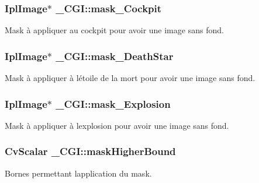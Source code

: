 \subsubsection[{\texorpdfstring{mask\+\_\+\+Cockpit}{mask_Cockpit}}]{\setlength{\rightskip}{0pt plus 5cm}Ipl\+Image$\ast$ \+\_\+\+C\+G\+I\+::mask\+\_\+\+Cockpit}\hypertarget{struct___c_g_i_abdbc066c115db2c77957e1b1cd51a996}{}\label{struct___c_g_i_abdbc066c115db2c77957e1b1cd51a996}
Mask à appliquer au cockpit pour avoir une image sans fond. 
\subsubsection[{\texorpdfstring{mask\+\_\+\+Death\+Star}{mask_DeathStar}}]{\setlength{\rightskip}{0pt plus 5cm}Ipl\+Image$\ast$ \+\_\+\+C\+G\+I\+::mask\+\_\+\+Death\+Star}\hypertarget{struct___c_g_i_a011dd009bdd05e19be0de580375359f3}{}\label{struct___c_g_i_a011dd009bdd05e19be0de580375359f3}
Mask à appliquer à l\textquotesingle{}étoile de la mort pour avoir une image sans fond. 
\subsubsection[{\texorpdfstring{mask\+\_\+\+Explosion}{mask_Explosion}}]{\setlength{\rightskip}{0pt plus 5cm}Ipl\+Image$\ast$ \+\_\+\+C\+G\+I\+::mask\+\_\+\+Explosion}\hypertarget{struct___c_g_i_ae134831216d4e19fd26f578b5e720066}{}\label{struct___c_g_i_ae134831216d4e19fd26f578b5e720066}
Mask à appliquer à l\textquotesingle{}explosion pour avoir une image sans fond. 
\subsubsection[{\texorpdfstring{mask\+Higher\+Bound}{maskHigherBound}}]{\setlength{\rightskip}{0pt plus 5cm}Cv\+Scalar \+\_\+\+C\+G\+I\+::mask\+Higher\+Bound}\hypertarget{struct___c_g_i_a7f03cda71a036dd30d70e957feee7a1c}{}\label{struct___c_g_i_a7f03cda71a036dd30d70e957feee7a1c}
Bornes permettant l\textquotesingle{}application du mask. 
